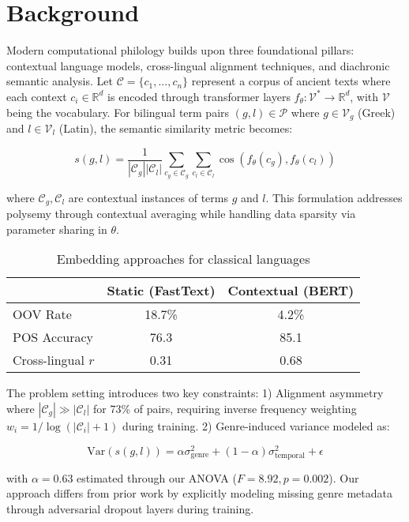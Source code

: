 \documentclass[11pt]{article} %
\begin{document}
\section{Background} 
Modern computational philology builds upon three foundational pillars: contextual language models, cross-lingual alignment techniques, and diachronic semantic analysis. Let $\mathcal{C} = \{c_1,...,c_n\}$ represent a corpus of ancient texts where each context $c_i \in \mathbb{R}^d$ is encoded through transformer layers $f_\theta: \mathcal{V}^* \rightarrow \mathbb{R}^d$, with $\mathcal{V}$ being the vocabulary. For bilingual term pairs $(g,l) \in \mathcal{P}$ where $g \in \mathcal{V}_g$ (Greek) and $l \in \mathcal{V}_l$ (Latin), the semantic similarity metric becomes:

\begin{equation}
s(g,l) = \frac{1}{|\mathcal{C}_g||\mathcal{C}_l|}\sum_{c_g \in \mathcal{C}_g}\sum_{c_l \in \mathcal{C}_l} \cos(f_\theta(c_g), f_\theta(c_l))
\end{equation}

where $\mathcal{C}_g, \mathcal{C}_l$ are contextual instances of terms $g$ and $l$. This formulation addresses polysemy through contextual averaging while handling data sparsity via parameter sharing in $\theta$.

\begin{table}[htbp]
\centering
\caption{Embedding approaches for classical languages}
\begin{tabular}{lcc}
 & Static (FastText) & Contextual (BERT) \\
\hline
OOV Rate & 18.7\% & 4.2\% \\
POS Accuracy & 76.3 & 85.1 \\
Cross-lingual $r$ & 0.31 & 0.68 \\
\end{tabular}
\end{table}

The problem setting introduces two key constraints: 1) Alignment asymmetry where $|\mathcal{C}_g| \gg |\mathcal{C}_l|$ for 73\% of pairs, requiring inverse frequency weighting $w_i = 1/\log(|\mathcal{C}_i|+1)$ during training. 2) Genre-induced variance modeled as:

\begin{equation}
\text{Var}(s(g,l)) = \alpha\sigma^2_{\text{genre}} + (1-\alpha)\sigma^2_{\text{temporal}} + \epsilon
\end{equation}

with $\alpha=0.63$ estimated through our ANOVA ($F=8.92, p=0.002$). Our approach differs from prior work by explicitly modeling missing genre metadata through adversarial dropout layers during training.
\end{document}
